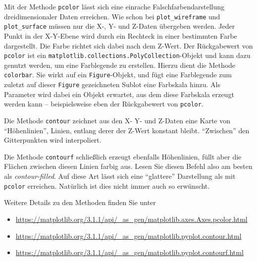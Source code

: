 Mit der Methode \texttt{pcolor} lässt sich eine einrache Falschfarbendarstellung dreidimensionaler Daten erreichen. Wie schon bei \texttt{plot\_wireframe} und \texttt{plot\_surface} müssen nur die X-, Y- und Z-Daten übergeben werden. Jeder Punkt in der X-Y-Ebene wird durch ein Rechteck in einer bestimmten Farbe dargestellt. Die Farbe richtet sich dabei nach dem Z-Wert. Der Rückgabewert von \texttt{pcolor} ist ein \texttt{matplotlib.collections.PolyCollection}-Objekt und kann \ua dazu genutzt werden, um eine Farblegende zu erstellen. Hierzu dient die Methode \texttt{colorbar}. Sie wirkt auf ein \texttt{Figure}-Objekt, und fügt eine Farblegende zum zuletzt auf dieser \texttt{Figure} gezeichneten Sublot eine Farbskala hinzu. Als Parameter wird dabei ein Objekt erwartet, aus dem diese Farbskala erzeugt werden kann -- beispielsweise eben der Rückgabewert von \texttt{pcolor}.

Die Methode \texttt{contour} zeichnet aus den X- Y- und Z-Daten eine Karte von \enquote{Höhenlinien}, \ie Linien, entlang derer der Z-Wert konstant bleibt. \enquote{Zwischen} den Gitterpunkten wird interpoliert.

Die Methode \texttt{contourf} schließlich erzeugt ebenfalls Höhenlinien, füllt aber die Flächen zwischen diesen Linien farbig aus. Lesen Sie diesen Befehl also am besten als \emph{contour-filled}. Auf diese Art lässt sich eine \enquote{glattere} Darstellung als mit \texttt{pcolor} erreichen. Natürlich ist dies nicht immer auch so erwünscht.

Weitere Details zu den Methoden finden Sie unter
\begin{itemize}
\item \url{https://matplotlib.org/3.1.1/api/_as_gen/matplotlib.axes.Axes.pcolor.html}
\item \url{https://matplotlib.org/3.1.1/api/_as_gen/matplotlib.pyplot.contour.html}
\item \url{https://matplotlib.org/3.1.1/api/_as_gen/matplotlib.pyplot.contourf.html}
\end{itemize}

